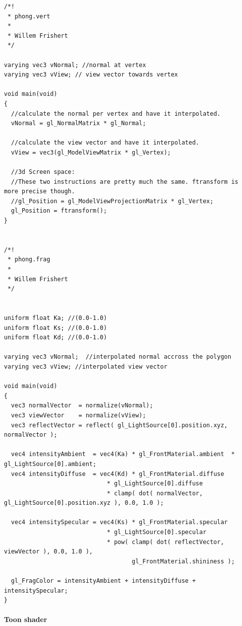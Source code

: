 \documentclass[a4paper,12pt]{article}
\newenvironment{mylisting}
{\begin{list}{}{\setlength{\leftmargin}{1em}}\item\scriptsize\bfseries}
{\end{list}}
\begin{document}
\begin{mylisting}
	\begin{verbatim}
/*!
 * phong.vert
 * 
 * Willem Frishert
 */

varying vec3 vNormal; //normal at vertex
varying vec3 vView; // view vector towards vertex

void main(void)
{
  //calculate the normal per vertex and have it interpolated.
  vNormal = gl_NormalMatrix * gl_Normal;

  //calculate the view vector and have it interpolated.
  vView = vec3(gl_ModelViewMatrix * gl_Vertex);
  
  //3d Screen space:
  //These two instructions are pretty much the same. ftransform is more precise though.
  //gl_Position = gl_ModelViewProjectionMatrix * gl_Vertex;
  gl_Position = ftransform();
}


/*!
 * phong.frag
 * 
 * Willem Frishert
 */


uniform float Ka; //(0.0-1.0)
uniform float Ks; //(0.0-1.0)
uniform float Kd; //(0.0-1.0)

varying vec3 vNormal;  //interpolated normal accross the polygon
varying vec3 vView; //interpolated view vector

void main(void)
{
  vec3 normalVector  = normalize(vNormal);
  vec3 viewVector    = normalize(vView);
  vec3 reflectVector = reflect( gl_LightSource[0].position.xyz, normalVector ); 

  vec4 intensityAmbient  = vec4(Ka) * gl_FrontMaterial.ambient  * gl_LightSource[0].ambient;
  vec4 intensityDiffuse  = vec4(Kd) * gl_FrontMaterial.diffuse
                             * gl_LightSource[0].diffuse
                             * clamp( dot( normalVector, gl_LightSource[0].position.xyz ), 0.0, 1.0 );
                                    
  vec4 intensitySpecular = vec4(Ks) * gl_FrontMaterial.specular 
                             * gl_LightSource[0].specular
                             * pow( clamp( dot( reflectVector, viewVector ), 0.0, 1.0 ),
                                    gl_FrontMaterial.shininess );

  gl_FragColor = intensityAmbient + intensityDiffuse + intensitySpecular;
}

	\end{verbatim}
\end{mylisting}

\pagebreak[4]

\paragraph{Toon shader}
\label{sec:ToonShaderSource}
\end{document}

